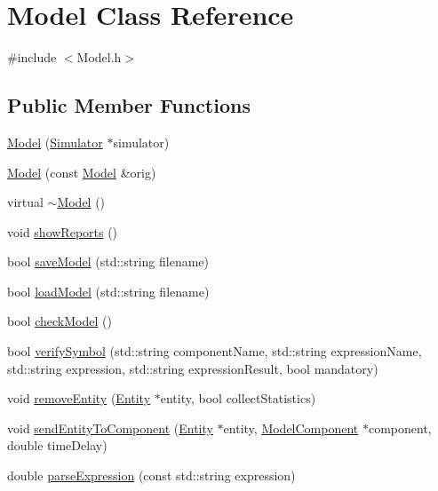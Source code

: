 \hypertarget{class_model}{}\section{Model Class Reference}
\label{class_model}


{\ttfamily \#include $<$Model.\+h$>$}

\subsection*{Public Member Functions}
\begin{DoxyCompactItemize}
\item 
\hyperlink{class_model_ae86e1403523e8036ba6366d1967ecac0}{Model} (\hyperlink{class_simulator}{Simulator} $\ast$simulator)
\item 
\hyperlink{class_model_afdedf278781f785abeecf5f450e43653}{Model} (const \hyperlink{class_model}{Model} \&orig)
\item 
virtual \hyperlink{class_model_ad6ebd2062a0b823db841a0b88baac4c0}{$\sim$\+Model} ()
\item 
void \hyperlink{class_model_a44c66f552308e7a6a5701801186a8637}{show\+Reports} ()
\item 
bool \hyperlink{class_model_ae099910781f5267a51fb5d607246af4a}{save\+Model} (std\+::string filename)
\item 
bool \hyperlink{class_model_aba57e8b62d4dcc3ac8e3037933fa6f04}{load\+Model} (std\+::string filename)
\item 
bool \hyperlink{class_model_ae3b293adffbef6fd254d661ceeb2e116}{check\+Model} ()
\item 
bool \hyperlink{class_model_ae2be8579f8519eec5da9e6f72c7ec361}{verify\+Symbol} (std\+::string component\+Name, std\+::string expression\+Name, std\+::string expression, std\+::string expression\+Result, bool mandatory)
\item 
void \hyperlink{class_model_ae62bb3a21cd56fbf9d34195edf2fb9e0}{remove\+Entity} (\hyperlink{class_entity}{Entity} $\ast$entity, bool collect\+Statistics)
\item 
void \hyperlink{class_model_a244dff6d6bef962b0d95fbe712954079}{send\+Entity\+To\+Component} (\hyperlink{class_entity}{Entity} $\ast$entity, \hyperlink{class_model_component}{Model\+Component} $\ast$component, double time\+Delay)
\item 
double \hyperlink{class_model_a5ea283e339b50c0b77040bf908e25af3}{parse\+Expression} (const std\+::string expression)
\item 

\end{DoxyCompactItemize}

